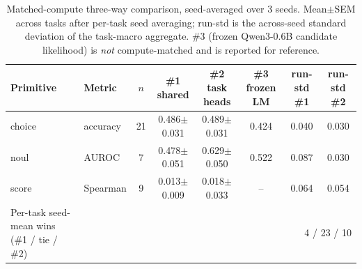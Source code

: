 \begin{table}[t]
\centering
\caption{Matched-compute three-way comparison, seed-averaged over 3 seeds. Mean$\pm$SEM across tasks after per-task seed averaging; run-std is the across-seed standard deviation of the task-macro aggregate. \#3 (frozen Qwen3-0.6B candidate likelihood) is \emph{not} compute-matched and is reported for reference.}
\label{tab:main}
\footnotesize\setlength{\tabcolsep}{3pt}
\begin{tabular}{llcccccc}
\toprule
Primitive & Metric & $n$ & \#1 shared & \#2 task heads & \#3 frozen LM & run-std \#1 & run-std \#2 \\
\midrule
choice & accuracy & 21 & 0.486$\pm$0.031 & 0.489$\pm$0.031 & 0.424 & 0.040 & 0.030 \\
noul & AUROC & 7 & 0.478$\pm$0.051 & 0.629$\pm$0.050 & 0.522 & 0.087 & 0.030 \\
score & Spearman & 9 & 0.013$\pm$0.009 & 0.018$\pm$0.033 & -- & 0.064 & 0.054 \\
\addlinespace
Per-task seed-mean wins (\#1 / tie / \#2) & & & \multicolumn{5}{r}{4 / 23 / 10} \\
\bottomrule
\end{tabular}
\end{table}
